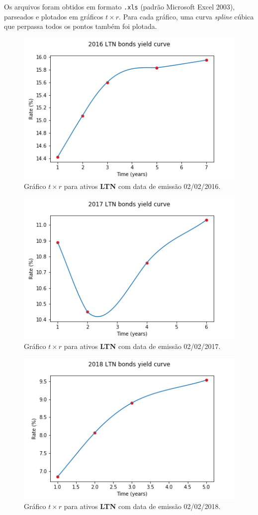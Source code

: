 \documentclass{article}
\begin{document}
Os arquivos foram obtidos em formato \texttt{.xls} (padrão Microsoft Excel 2003), parseados e plotados em gráficos $t \times r$.
Para cada gráfico, uma curva \emph{spline} cúbica que perpassa todos os pontos também foi plotada.


\begin{figure}[]
	\includegraphics[width=0.6\linewidth]{Figure_0.png}
	\centering
	
	\caption{Gráfico $t \times r$ para ativos \textbf{LTN} com data de emissão 02/02/2016.}
	\label{}
\end{figure}

\begin{figure}[]
	\includegraphics[width=0.6\linewidth]{Figure_1.png}
	\centering
	
	\caption{Gráfico $t \times r$ para ativos \textbf{LTN} com data de emissão 02/02/2017.}
	\label{}
\end{figure}

\begin{figure}[]
	\includegraphics[width=0.6\linewidth]{Figure_2.png}
	\centering
	
	\caption{Gráfico $t \times r$ para ativos \textbf{LTN} com data de emissão 02/02/2018.}
	\label{}
\end{figure}
\end{document}
